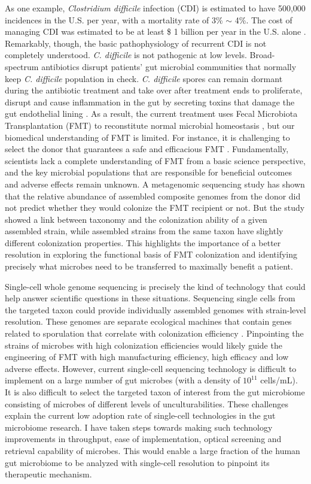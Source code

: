 As one example, \textit{Clostridium difficile} infection (CDI) is estimated to have 500,000 incidences in the U.S. per year, with a mortality rate of 3\% $\sim$ 4\%. The cost of managing CDI was estimated to be at least \$ 1 billion per year in the U.S. alone \cite{Ghantoji:2010ku}. Remarkably, though, the basic pathophysiology of recurrent CDI is not completely understood. \textit{C. difficile} is not pathogenic at low levels. Broad-spectrum antibiotics disrupt patients' gut microbial communities that normally keep \textit{C. difficile} population in check. \textit{C. difficile} spores can remain dormant during the antibiotic treatment and take over after treatment ends to proliferate, disrupt and cause inflammation in the gut by secreting toxins that damage the gut endothelial lining \cite{Bakken:2011fs}. As a result, the current treatment uses Fecal Microbiota Transplantation (FMT) to reconstitute normal microbial homeostasis \cite{Kassam:2013dv}, but our biomedical understanding of FMT is limited. For instance, it is challenging to select the donor that guarantees a safe and efficacious FMT \cite{Ratner:2016dm}. Fundamentally, scientists lack a complete understanding of FMT from a basic science perspective, and the key microbial populations that are responsible for beneficial outcomes and adverse effects remain unknown. A metagenomic sequencing study \cite{Lee:2017jw} has shown that the relative abundance of assembled composite genomes from the donor did not predict whether they would colonize the FMT recipient or not. But the study showed a link between taxonomy and the colonization ability of a given assembled strain, while assembled strains from the same taxon have slightly different colonization properties. This highlights the importance of a better resolution in exploring the functional basis of FMT colonization and identifying precisely what microbes need to be transferred to maximally benefit a patient. 

Single-cell whole genome sequencing is precisely the kind of technology that could help answer scientific questions in these situations. Sequencing single cells from the targeted taxon could provide individually assembled genomes with strain-level resolution. These genomes are separate ecological machines that contain genes related to sporulation that correlate with colonization efficiency \cite{Nayfach:2016dm}. Pinpointing the strains of microbes with high colonization efficiencies would likely guide the engineering of FMT with high manufacturing efficiency, high efficacy and low adverse effects. However, current single-cell sequencing technology is difficult to implement on a large number of gut microbes (with a density of $10^{11}$ cells/mL). It is also difficult to select the targeted taxon of interest from the gut microbiome consisting of microbes of different levels of unculturabilities. These challenges explain the current low adoption rate of single-cell technologies in the gut microbiome research. I have taken steps towards making such technology improvements in throughput, ease of implementation, optical screening and retrieval capability of microbes. This would enable a large fraction of the human gut microbiome to be analyzed with single-cell resolution to pinpoint its therapeutic mechanism. 

